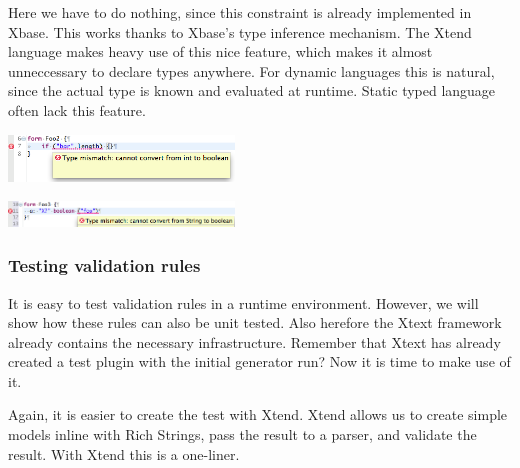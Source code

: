 Here we have to do nothing, since this constraint is already implemented in
Xbase. This works thanks to Xbase's type inference mechanism. The Xtend language
makes heavy use of this nice feature, which makes it almost unneccessary to
declare types anywhere. For dynamic languages this is natural, since the actual
type is known and evaluated at runtime. Static typed language often lack this
feature.

\includegraphics[width=6cm]{images/chapter04/validation_2.png}

\includegraphics[width=6cm]{images/chapter04/validation_3.png}


\subsubsection{Testing validation rules}

It is easy to test validation rules in a runtime environment. However, we will
show how these rules can also be unit tested. Also herefore the Xtext framework
already contains the necessary infrastructure. Remember that Xtext has already
created a test plugin with the initial generator run? Now it is time to make use
of it.

Again, it is easier to create the test with Xtend. Xtend allows us to create
simple models inline with Rich Strings, pass the result to a parser, and
validate the result. With Xtend this is a one-liner.

